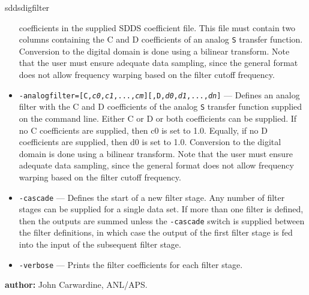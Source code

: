 \begin{sddsprog}{sddsdigfilter}
\begin{itemize}
        coefficients in the supplied SDDS coefficient file. This file must contain two columns containing the C and D
        coefficients of an analog \verb|S| transfer function. Conversion to the digital domain is done using a bilinear
        transform. Note that the user must ensure adequate data sampling, since the general format does not allow frequency
        warping based on the filter cutoff frequency.
      \item {\tt -analogfilter=[C,{\em c0},{\em c1},...,{\em cm}][,D,{\em d0},{\em d1},...,{\em dn}]} --- Defines an analog
        filter with the C and D coefficients of the analog \verb|S| transfer function supplied on the command line. Either C or
        D or both coefficients can be supplied. If no C coefficients are supplied, then c0 is set to 1.0. Equally, if no D
        coefficients are supplied, then d0 is set to 1.0. Conversion to the digital domain is done using a bilinear transform.
        Note that the user must ensure adequate data sampling, since the general format does not allow frequency warping based on
        the filter cutoff frequency.
      \item {\tt -cascade} --- Defines the start of a new filter stage. Any number of filter stages can be supplied for a single
        data set. If more than one filter is defined, then the outputs are summed unless the {\tt -cascade} switch is supplied
        between the filter definitions, in which case the output of the first filter stage is fed into the input of the
        subsequent filter stage.
      \item {\tt -verbose} --- Prints the filter coefficients for each filter stage.
    \end{itemize}
  \item \textbf{author:} John Carwardine, ANL/APS.
\end{sddsprog}

